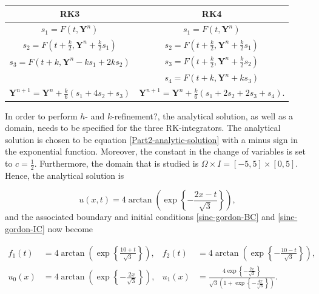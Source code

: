 \setlength{\arrayrulewidth}{0.5mm}
\setlength{\tabcolsep}{18pt}
\renewcommand{\arraystretch}{2.3}
\begin{center}
    \begin{tabular}{ |c | c| }
          \hline			
          RK3 & RK4 \\
          \hline
          $s_1 = F(t,\boldsymbol{Y}^n)$  &   $s_1 = F(t,\boldsymbol{Y}^n)$ \\
          $s_2 = F(t+\frac{k}{2}, \boldsymbol{Y}^n + \frac{k}{2}s_1)$ &   $s_2 = F(t+\frac{k}{2}, \boldsymbol{Y}^n+\frac{k}{2}s_1)$ \\
    $s_3 = F(t+k,\boldsymbol{Y}^n-k s_1 + 2k s_2)$ & $s_3 = F(t + \frac{k}{2}, \boldsymbol{Y}^n + \frac{k}{2}s_2)$ \\
         &    $s_4 = F(t+k,\boldsymbol{Y}^n+k s_3)$  \\
          \hline
          $\boldsymbol{Y}^{n+1} = \boldsymbol{Y}^n + \frac{k}{6}\left(s_1 + 4s_2 +  s_3\right)$ & $\boldsymbol{Y}^{n+1} = \boldsymbol{Y}^n + \frac{k}{6} \left(s_1+2s_2+2s_3+s_4\right)$. \\
         \hline
    \end{tabular}
\end{center}

In order to perform $h$- and $k$-refinement?, the analytical solution, as well as a domain, needs to be specified for the three RK-integrators. The analytical solution is chosen to be equation \eqref{Part2-analytic-solution} with a minus sign in the exponential function. Moreover, the constant in the change of variables is set to $c=\frac{1}{2}$. Furthermore, the domain that is studied is $\Omega \times I = [-5,5] \times [0,5]$. Hence, the analytical solution is

\begin{equation}
    u(x,t) = 4\arctan{\left(\exp{\left\{-\frac{2x-t}{\sqrt{3}}\right\}}\right)},
    \label{Part2-analytic-solution-specified}
\end{equation}
and the associated boundary and initial conditions \eqref{sine-gordon-BC}
and \eqref{sine-gordon-IC} now become

\begin{equation}
\begin{aligned}
\label{Part2-specified-BC&IC_d&e}
    f_1(t) &= 4\arctan{\left(\exp{\left\{\frac{10+t}{\sqrt{3}}\right\}}\right)},  & f_2(t) & = 4\arctan{\left(\exp{\left\{-\frac{10-t}{\sqrt{3}}\right\}}\right)}, \\
    u_0(x) &= 4\arctan{\left( \exp{\left\{-\frac{2x}{\sqrt{3}}\right\}} \right)},  & u_1(x) &= \frac{4\exp{\left\{- \frac{2x}{\sqrt{3}}\right\}}}{\sqrt{3}\left(1 + \exp{\left\{- \frac{4x}{\sqrt{3}} \right\}} \right)}.
\end{aligned}
\end{equation}

